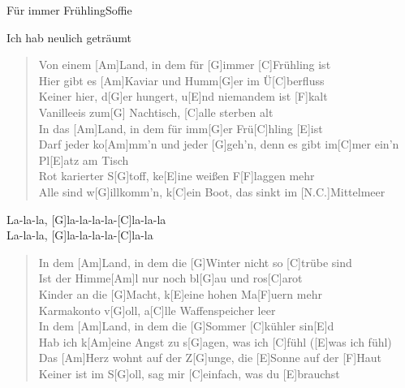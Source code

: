 \begin{song}{F\"ur immer Fr\"uhling}{Soffie}

    \begin{intro}  
        Ich hab neulich geträumt
    \end{intro}  

    \begin{verse}  
        Von einem [Am]Land, in dem für [G]immer [C]Frühling ist \\
        Hier gibt es [Am]Kaviar und Humm[G]er im Ü[C]berfluss \\
        [Am]Keiner hier, d[G]er hungert, u[E]nd niemandem ist [F]kalt \\
        [Am]Vanilleeis zum[G] Nachtisch, [C]alle sterben alt \\
        In das [Am]Land, in dem für imm[G]er Frü[C]hling [E]ist \\
        Darf jeder ko[Am]mm'n und jeder [G]geh'n, denn es gibt im[C]mer ein'n Pl[E]atz am Tisch \\
        [Am]Rot karierter S[G]toff, ke[E]ine weißen F[F]laggen mehr \\
        [Am]Alle sind w[G]illkomm'n, k[C]ein Boot, das sinkt im [N.C.]Mittelmeer 
    \end{verse}  

    \begin{chorus}
        [Am]La-la-la, [G]la-la-la-la-[C]la-la-la \\
        [Am]La-la-la, [G]la-la-la-la-[C]la-la
    \end{chorus}

    \begin{verse}  
        In dem [Am]Land, in dem die [G]Winter nicht so [C]trübe sind \\
        Ist der Himme[Am]l nur noch bl[G]au und ros[C]arot \\
        [Am]Kinder an die [G]Macht, k[E]eine hohen Ma[F]uern mehr \\
        [Am]Karmakonto v[G]oll, a[C]lle Waffenspeicher leer \\
        In dem [Am]Land, in dem die [G]Sommer [C]k\"uhler sin[E]d \\
        Hab ich k[Am]eine Angst zu s[G]agen, was ich [C]fühl ([E]was ich fühl) \\
        Das [Am]Herz wohnt auf der Z[G]unge, die [E]Sonne auf der [F]Haut \\
        [Am]Keiner ist im S[G]oll, sag mir [C]einfach, was du [E]brauchst 
    \end{verse}  


\end{song}
